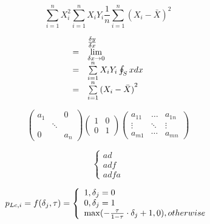 \begin{equation}
\sum\limits_{i = 1}^n {X_i^2} \sum\limits_{i = 1}^n {{X_i}{Y_i}} \frac{1}{n}\sum\limits_{i = 1}^n {{{({X_i} - \bar X)}^2}}       
\end{equation}

\begin{equation}
\begin{array}{lllll}
& \frac{{\delta y}}{{\delta x}}\\
{\rm{ = }} & \mathop {\lim }\limits_{\delta x \to 0} \\
{\rm{ = }} & \sum\limits_{i = 1}^n {{X_i}{Y_i}} \oint_S x dx\\
{\rm{ = }} & \sum\limits_{i = 1}^n {{{({X_i} - \bar X)}^2}} 
\end{array}
\end{equation}           %

\[\left( {\begin{array}{*{20}{c}}
	{{a_1}}&{}&0\\
	{}& \ddots &{}\\
	0&{}&{{a_n}}
	\end{array}} \right)\left( {\begin{array}{*{20}{c}}
	1&0\\
	0&1
	\end{array}} \right)\left( {\begin{array}{*{20}{c}}
	{{a_{11}}}& \ldots &{{a_{1n}}}\\
	\vdots & \ddots & \vdots \\
	{{a_{m1}}}& \cdots &{{a_{mn}}}
	\end{array}} \right)\]


\[\left\{ \begin{array}{l}
ad\\
adf\\
adfa
\end{array} \right.\]

\begin{equation}
{p_{Lc,i}} = f({\delta _j},\tau ) = \left\{ \begin{array}{l}
1    ,{\delta _j} = 0\\
0   , {\delta _j} = 1\\
\max ( - \frac{\tau }{{1 - \tau }} \cdot {\delta _j} + 1,0){\rm{     }},otherwise{\rm{ }}
\end{array} \right.
\end{equation} 


